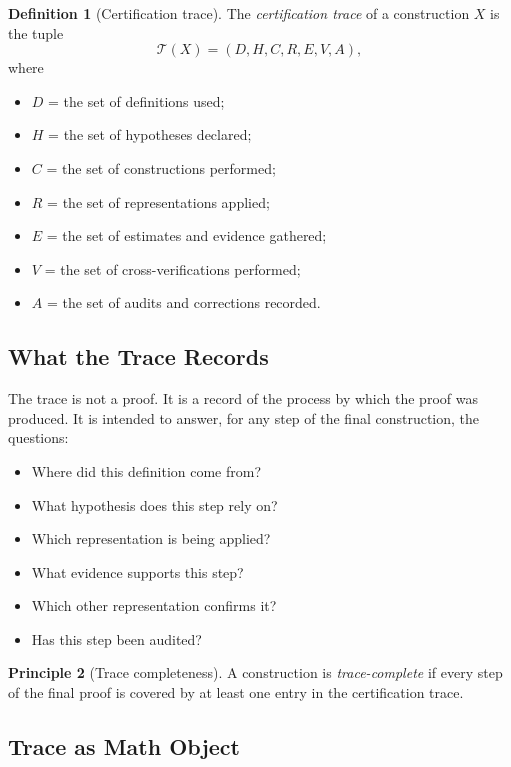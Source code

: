\documentclass[11pt,a4paper]{article}
\theoremstyle{definition}
\newtheorem{definition}{Definition}[section]
\newtheorem{principle}[definition]{Principle}
\theoremstyle{plain}
\newcommand{\Tcal}{\mathcal{T}}
\begin{document}
\begin{definition}[Certification trace]\label{def:trace}
The \emph{certification trace} of a construction $X$ is the tuple
\[
  \Tcal(X)
  =
  (D, H, C, R, E, V, A),
\]
where
\begin{itemize}
  \item $D$ = the set of definitions used;
  \item $H$ = the set of hypotheses declared;
  \item $C$ = the set of constructions performed;
  \item $R$ = the set of representations applied;
  \item $E$ = the set of estimates and evidence gathered;
  \item $V$ = the set of cross-verifications performed;
  \item $A$ = the set of audits and corrections recorded.
\end{itemize}
\end{definition}

\subsection{What the Trace Records}

The trace is not a proof. It is a record of the process by which
the proof was produced. It is intended to answer, for any step of
the final construction, the questions:
\begin{itemize}
  \item Where did this definition come from?
  \item What hypothesis does this step rely on?
  \item Which representation is being applied?
  \item What evidence supports this step?
  \item Which other representation confirms it?
  \item Has this step been audited?
\end{itemize}

\begin{principle}[Trace completeness]\label{pr:trace}
A construction is \emph{trace-complete} if every step of the final
proof is covered by at least one entry in the certification trace.
\end{principle}

\subsection{Trace as Math Object}
\end{document}
